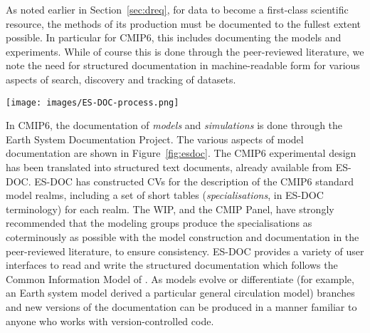 \documentclass[gmd,manuscript]{copernicus}
\newcommand{\bibref}[1] { \cite{ref:#1}}
\newcommand{\figref}[1] {\mbox{Figure   \ref{fig:#1}}}
\newcommand{\secref}[1] {\mbox{Section  \ref{sec:#1}}}
\begin{document}
As noted earlier in \secref{dreq}, for data to become a first-class
scientific resource, the methods of its production must be documented
to the fullest extent possible. In particular for CMIP6, this includes
documenting the models and experiments. While of course this is done
through the peer-reviewed literature, we note the need for structured
documentation in machine-readable form for various aspects of search,
discovery and tracking of datasets. 


\begin{figure*}
  \begin{center}
    \texttt{[image: images/ES-DOC-process.png]}
  \end{center}
  \caption{Flowchart of ES-DOC documentation process, delineating
    sequence of events and indicating the parties responsible for
    producing the documentation. Figure courtesy Eric Guilyardi and
    Mark Greenslade.}
  \label{fig:esdoc}
\end{figure*}

In CMIP6, the documentation of \emph{models} and \emph{simulations} is
done through the Earth System Documentation
\citep[\href{https://goo.gl/WNwKD9}{ES-DOC},][]{ref:guilyardietal2013}
Project. The various aspects of model documentation are shown in
\figref{esdoc}. The CMIP6 experimental design has been translated into
structured text documents, already available from ES-DOC. ES-DOC has
constructed CVs for the description of the CMIP6 standard model
realms, including a set of short tables (\emph{specialisations}, in
ES-DOC terminology) for each realm. The WIP, and the CMIP Panel, have
strongly recommended that the modeling groups produce the
specialisations as coterminously as possible with the model
construction and documentation in the peer-reviewed literature, to
ensure consistency. ES-DOC provides a variety of user interfaces to
read and write the structured documentation which follows the Common
Information Model of \bibref{lawrenceetal2012}. As models evolve or
differentiate (for example, an Earth system model derived a particular
general circulation model) branches and new versions of the
documentation can be produced in a manner familiar to anyone who works
with version-controlled code.
\end{document}
